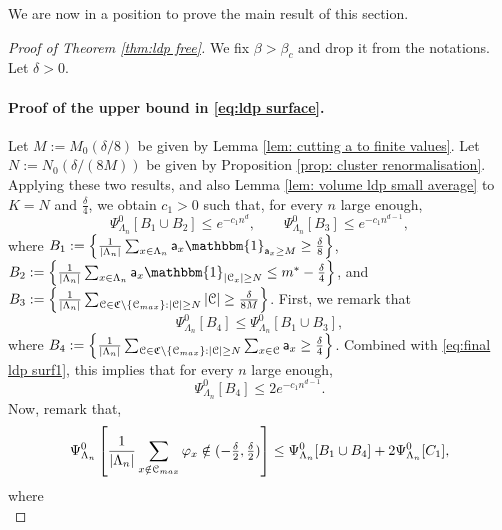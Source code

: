 \documentclass[11pt,a4paper]{article}
\theoremstyle{definition}
\numberwithin{equation}{section}
\begin{document}
We are now in a position to prove the main result of this section.
\begin{proof}[Proof of Theorem \textup{\ref{thm:ldp free}}] We fix $\beta>\beta_c$ and drop it from the notations. Let $\delta>0$.

\paragraph{Proof of the upper bound in \eqref{eq:ldp surface}.} Let $M:=M_0(\delta/8)$ be given by Lemma \ref{lem: cutting a to finite values}. Let $N:=N_0(\delta/(8M))$ be given by Proposition \ref{prop: cluster renormalisation}. Applying these two results, and also Lemma \ref{lem: volume ldp small average} to $K=N$ and $\tfrac{\delta}{4}$, we obtain $c_1>0$ such that, for every $n$ large enough,
\begin{equation}\label{eq:final ldp surf1}
    \Psi^0_{\Lambda_n}[B_1\cup B_2]\leq e^{-c_1n^d}, \qquad \Psi^0_{\Lambda_n}[ B_3]\leq e^{-c_1n^{d-1}},
\end{equation}
where $B_1:=\left\{\tfrac{1}{|\Lambda_n|}\sum_{x\in \Lambda_n}\mathsf{a}_x\mathbbm{1}_{\mathsf{a}_x\geq M}\geq \frac{\delta}{8}\right\}$, $B_2:=\left\{\tfrac{1}{|\Lambda_n|}\sum_{x\in \Lambda_n}\mathsf{a}_x\mathbbm{1}_{|\mathcal{C}_x|\geq N}\leq m^*-\frac{\delta}{4}\right\}$, and $B_3:=\left\{\tfrac{1}{|\Lambda_n|}\sum_{\mathcal{C}\in \mathfrak{C}\setminus \{\mathcal{C}_{\rm max}\}: |\mathcal{C}|\geq N}|\mathcal{C}|\geq \tfrac{\delta}{8M}\right\}$. First, we remark that
\begin{equation}
    \Psi^0_{\Lambda_n}[B_4]\leq \Psi^0_{\Lambda_n}[B_1\cup B_3],
\end{equation}
where $B_4:=\left\{\tfrac{1}{|\Lambda_n|}\sum_{\mathcal{C}\in \mathfrak{C}\setminus \{\mathcal{C}_{\rm max}\}: |\mathcal{C}|\geq N}\sum_{x\in \mathcal{C}}\mathsf{a}_x\geq \tfrac{\delta}{4}\right\}$. Combined with \eqref{eq:final ldp surf1}, this implies that for every $n$ large enough,
\begin{equation}\label{eq:final ldp surf1.5}
    \Psi^0_{\Lambda_n}[B_4]\leq 2e^{-c_1n^{d-1}}.
\end{equation}
Now, remark that,
\begin{equation}\label{eq:final ldp surf2}
    \Psi^0_{\Lambda_n}\left[\frac{1}{|\Lambda_n|}\sum_{x\notin \mathcal{C}_{\rm max}}\varphi_x\notin(-\tfrac{\delta}{2},\tfrac{\delta}{2})\right]\leq \Psi_{\Lambda_n}^0[B_1\cup B_4]+2\Psi^0_{\Lambda_n}[C_1],
\end{equation}
where
\begin{equation}

\end{equation}
\end{proof}
\end{document}
